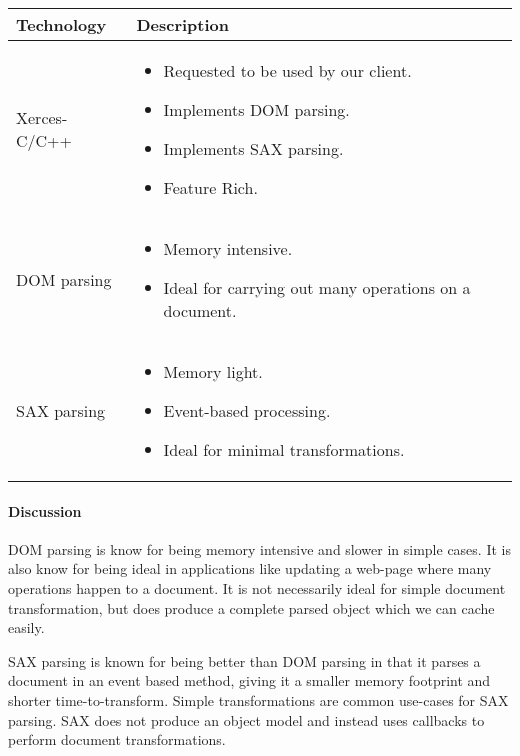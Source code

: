 \begin{center}
  \begin{tabular}{ | l | p{10cm} | }
    \hline
    Technology & Description  \\ \hline
    Xerces-C/C++ \cite{xerces} &
    \begin{itemize}
      \item Requested to be used by our client.
      \item Implements DOM parsing.
      \item Implements SAX parsing.
      \item Feature Rich.
    \end{itemize}\\ \hline
    DOM parsing \cite{dom-vs-sax} &
    \begin{itemize}
      \item Memory intensive.
      \item Ideal for carrying out many operations on a document.
    \end{itemize}\\ \hline
    SAX parsing \cite{dom-vs-sax} &
    \begin{itemize}
      \item Memory light.
      \item Event-based processing.
      \item Ideal for minimal transformations.
    \end{itemize}\\ \hline
  \end{tabular}
\end{center}

\paragraph{Discussion}

DOM parsing is know for being memory intensive and slower in simple cases.
It is also know for being ideal in applications like updating a web-page where many operations happen to a document.
It is not necessarily ideal for simple document transformation, but does produce a complete parsed object which we can cache easily.

SAX parsing is known for being better than DOM parsing in that it parses a document in an event based method, giving it a smaller memory footprint and shorter time-to-transform.
Simple transformations are common use-cases for SAX parsing.
SAX does not produce an object model and instead uses callbacks to perform document transformations.

